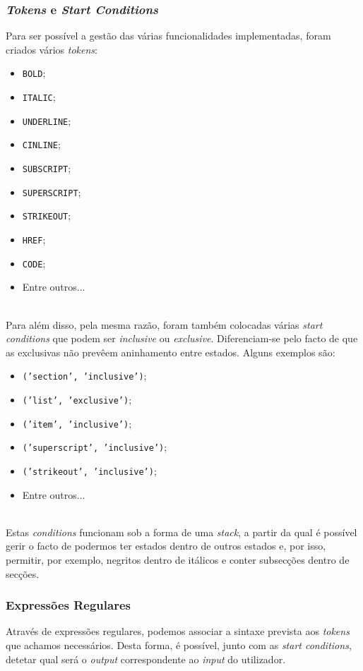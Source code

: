 \documentclass{article}
\begin{document}
\subsubsection{\textit{Tokens} e \textit{Start Conditions}}
Para ser possível a gestão das várias funcionalidades implementadas, foram criados vários \textit{tokens}: 
\begin{itemize}
\item \texttt{BOLD};
\item \texttt{ITALIC};
\item \texttt{UNDERLINE};
\item \texttt{CINLINE};
\item \texttt{SUBSCRIPT};
\item \texttt{SUPERSCRIPT};
\item \texttt{STRIKEOUT};
\item \texttt{HREF};
\item \texttt{CODE};
\item Entre outros...
\end{itemize}
\\
 Para além disso, pela mesma razão, foram também colocadas várias \textit{start conditions} que podem ser \textit{inclusive} ou \textit{exclusive}. Diferenciam-se pelo facto de que as exclusivas não prevêem aninhamento entre estados. Alguns exemplos são: 
\begin{itemize}
\item \texttt{('section', 'inclusive')};
\item \texttt{('list', 'exclusive')};
\item \texttt{('item', 'inclusive')};
\item \texttt{('superscript', 'inclusive')};
\item \texttt{('strikeout', 'inclusive')};
\item Entre outros...
\end{itemize}
\\
 Estas \textit{conditions} funcionam sob a forma de uma \textit{stack}, a partir da qual é possível gerir o facto de podermos ter estados dentro de outros estados e, por isso, permitir, por exemplo, negritos dentro de itálicos e conter subsecções dentro de secções. \subsubsection{Expressões Regulares}
Através de expressões regulares, podemos associar a sintaxe prevista aos \textit{tokens} que achamos necessários. Desta forma, é possível, junto com as \textit{start conditions}, detetar qual será o \textit{output} correspondente ao \textit{input} do utilizador.\\
\end{document}
